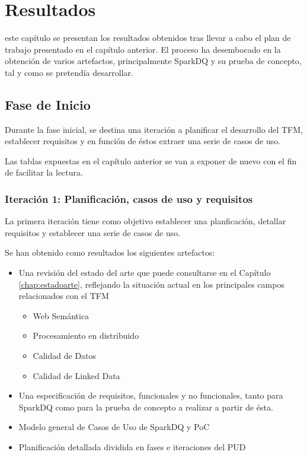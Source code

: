 \chapter{Resultados}
\label{chap:resultados}

 este capítulo se presentan los resultados obtenidos tras llevar a
cabo el plan de trabajo presentado en el capítulo anterior. El proceso ha
desembocado en la obtención de varios artefactos, principalmente SparkDQ y su
prueba de concepto, tal y como se pretendía desarrollar.

\section{Fase de Inicio}

Durante la fase inicial, se destina una iteración a planificar el desarrollo del
\acs{TFM}, establecer requisitos y en función de éstos extraer una serie de
casos de uso.

Las tablas expuestas en el capítulo anterior se van a exponer de nuevo con el
fin de facilitar la lectura.

\subsection{Iteración 1: Planificación, casos de uso y requisitos}

La primera iteración tiene como objetivo establecer una planficación, detallar
requisitos y establecer una serie de casos de uso.

Se han obtenido como resultados los siguientes artefactos:

\begin{itemize}
\item Una revisión del estado del arte que puede consultarse en el Capítulo
  \ref{chap:estadoarte}, reflejando la situación actual en los principales
  campos relacionados con el \acs{TFM}
  \begin{itemize}
  \item Web Semántica
  \item Procesamiento en distribuido
  \item Calidad de Datos
  \item Calidad de Linked Data
  \end{itemize}

\item Una especificación de requisitos, funcionales y no funcionales, tanto para
  SparkDQ como para la prueba de concepto a realizar a partir de ésta.
\item Modelo general de Casos de Uso de SparkDQ y \acs{PoC}
\item Planificación detallada dividida en fases e iteraciones del \acs{PUD}
\end{itemize}

